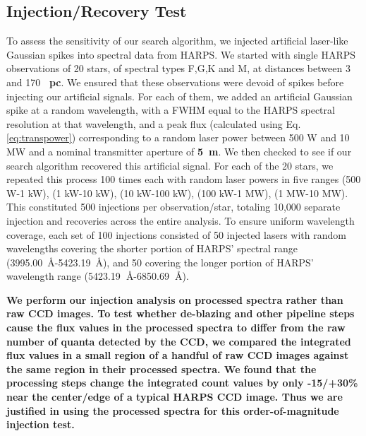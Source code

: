 \documentclass[linenumbers]{aastex701}
\providecommand{\DIFadd}[1]{{\bf #1}} %
\providecommand{\DIFaddbegin}{} %
\providecommand{\DIFaddend}{} %
\begin{document}
\subsection{Injection/Recovery Test}
\label{s:injection_and_recovery}
To assess the sensitivity of our search algorithm, we injected artificial laser-like Gaussian spikes into spectral data from HARPS. We started with single HARPS observations of 20 stars, of spectral
types F,G,K and M, at distances between 3 and 170 \DIFaddbegin \DIFadd{~pc}\DIFaddend . We ensured that these observations were devoid of spikes before injecting our artificial signals.  For each of them, we added an
artificial Gaussian spike at a random wavelength, with a FWHM equal to the HARPS spectral
resolution at that wavelength, and a peak flux (calculated using Eq. \ref{eq:transpower}) corresponding to a random laser power between 500 W and 10 MW and a nominal transmitter aperture of  \DIFaddbegin \DIFadd{5~m}\DIFaddend . We then checked to see if our search algorithm recovered this artificial signal. For each of the 20 stars, we repeated this process 100 times each with random laser powers in five ranges (500 W-1 kW), (1 kW-10 kW), (10 kW-100 kW), (100 kW-1 MW), (1 MW-10 MW). This constituted 500 injections per observation/star, totaling 10,000 separate injection and recoveries across the entire analysis. To ensure uniform wavelength coverage, each set of 100 injections consisted of 50 injected lasers with random wavelengths covering the shorter portion of HARPS' spectral range (3995.00~\AA-5423.19~\AA), and 50 covering the longer portion of HARPS' wavelength range (5423.19\DIFaddbegin \DIFadd{~}\DIFaddend \AA-6850.69\DIFaddbegin \DIFadd{~}\DIFaddend \AA).

\DIFaddbegin \DIFadd{We perform our injection analysis on processed spectra rather than raw CCD images.  To test whether de-blazing and other pipeline steps cause the flux values in the processed spectra to differ from the raw number of quanta detected by the CCD, we compared the integrated flux values in a small region of a handful of raw CCD images against the same region in their processed spectra.  We found that the processing steps change the integrated count values by only -15/+30\% near the center/edge of a typical HARPS CCD image.  Thus we are justified in using the processed spectra for this order-of-magnitude injection test. 
}
\end{document}
